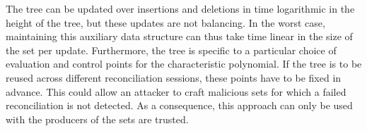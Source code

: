 The tree can be updated over insertions and deletions in time logarithmic in the height of the tree, but these updates are not balancing. In the worst case, maintaining this auxiliary data structure can thus take time linear in the size of the set per update. Furthermore, the tree is specific to a particular choice of evaluation and control points for the characteristic polynomial. If the tree is to be reused across different reconciliation sessions, these points have to be fixed in advance. This could allow an attacker to craft malicious sets for which a failed reconciliation is not detected. As a consequence, this approach can only be used with the producers of the sets are trusted.
